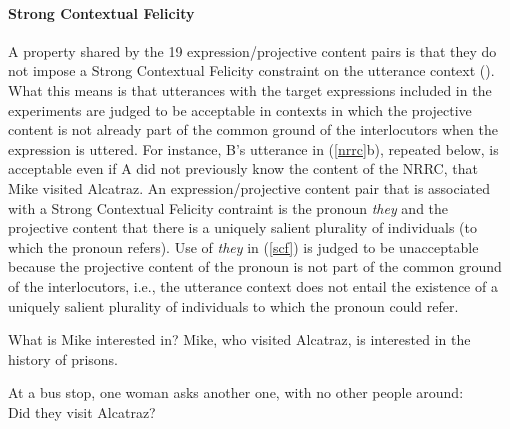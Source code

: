 \documentclass[11pt,fleqn]{article}
\newcommand{\6}{\mbox{$[\hspace*{-.6mm}[$}}
\newcommand{\9}{\mbox{$]\hspace*{-.6mm}]$}}
\def\infelic{{\leavevmode\llap{\#}}}
\begin{document}
\paragraph{Strong Contextual Felicity} A property shared by the 19 expression/projective content pairs is that they do not impose a Strong Contextual Felicity constraint on the utterance context (\citealt{brst-lang11}). What this means is that utterances with the target expressions included in the experiments are judged to be acceptable in contexts in which the projective content is not already part of the common ground of the interlocutors when the expression is uttered. For instance, B's utterance in (\ref{nrrc}b), repeated below, is acceptable even if A did not previously know the content of the NRRC, that Mike visited Alcatraz. An expression/projective content pair that is associated with a Strong Contextual Felicity contraint is the pronoun {\em they} and the projective content that there is a uniquely salient plurality of individuals (to which the pronoun refers). Use of {\em they} in (\ref{scf}) is judged to be unacceptable because the projective content of the pronoun is not part of the common ground of the interlocutors, i.e., the utterance context does not entail the existence of a uniquely salient plurality of individuals to which the pronoun could refer. 

\begin{exe}
\begin{xlist}
 What is Mike interested in?
 Mike, who visited Alcatraz, is interested in the history of prisons.
\end{xlist}

\ex\label{scf} At a bus stop, one woman asks another one, with no other people around: \\ \infelic Did they visit Alcatraz?
\end{exe}
\end{document}
